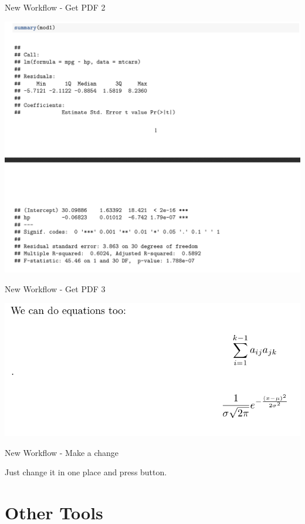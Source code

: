 \begin{frame}{New Workflow - Get PDF 2}

\includegraphics{images/pdf2.png}

\end{frame}

\begin{frame}{New Workflow - Get PDF 3}

\includegraphics{images/pdf3.png}

\end{frame}

\begin{frame}{New Workflow - Make a change}

\huge{Just change it in one place and press button.}

\end{frame}

\section{Other Tools}\label{other-tools}

